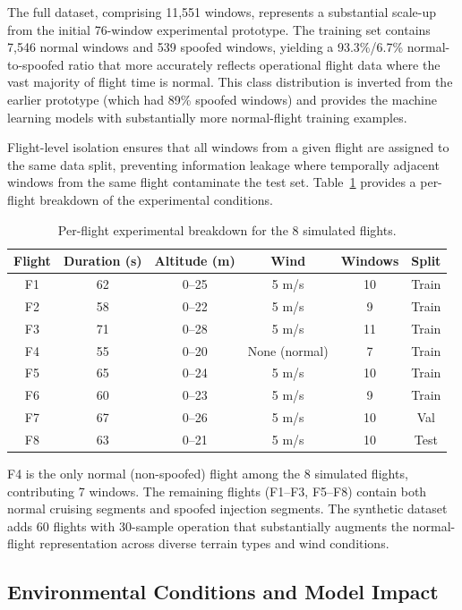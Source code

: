 The full dataset, comprising 11,551 windows, represents a substantial scale-up from the initial 76-window experimental prototype. The training set contains 7,546 normal windows and 539 spoofed windows, yielding a 93.3\%/6.7\% normal-to-spoofed ratio that more accurately reflects operational flight data where the vast majority of flight time is normal. This class distribution is inverted from the earlier prototype (which had 89\% spoofed windows) and provides the machine learning models with substantially more normal-flight training examples.

Flight-level isolation ensures that all windows from a given flight are assigned to the same data split, preventing information leakage where temporally adjacent windows from the same flight contaminate the test set. Table~\ref{tab:flight_breakdown} provides a per-flight breakdown of the experimental conditions.

\begin{table}[H]
\centering
\caption{Per-flight experimental breakdown for the 8 simulated flights.}
\label{tab:flight_breakdown}
\small
\begin{tabular}{@{}cccccc@{}}
\toprule
\textbf{Flight} & \textbf{Duration (s)} & \textbf{Altitude (m)} & \textbf{Wind} & \textbf{Windows} & \textbf{Split} \\
\midrule
F1 & 62  & 0--25 & 5 m/s & 10 & Train \\
F2 & 58  & 0--22 & 5 m/s & 9 & Train \\
F3 & 71  & 0--28 & 5 m/s & 11 & Train \\
F4 & 55  & 0--20 & None (normal) & 7 & Train \\
F5 & 65  & 0--24 & 5 m/s & 10 & Train \\
F6 & 60  & 0--23 & 5 m/s & 9 & Train \\
F7 & 67  & 0--26 & 5 m/s & 10 & Val \\
F8 & 63  & 0--21 & 5 m/s & 10 & Test \\
\bottomrule
\end{tabular}
\end{table}

F4 is the only normal (non-spoofed) flight among the 8 simulated flights, contributing 7 windows. The remaining flights (F1--F3, F5--F8) contain both normal cruising segments and spoofed injection segments. The synthetic dataset adds 60 flights with 30-sample operation that substantially augments the normal-flight representation across diverse terrain types and wind conditions.

\subsection{Environmental Conditions and Model Impact}

